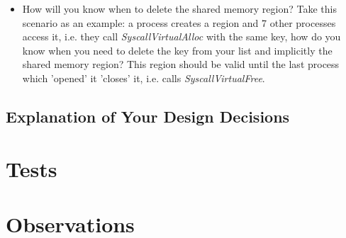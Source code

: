 \begin{enumerate}
\begin{itemize}
						\item How will you know when to delete the shared memory region? Take this scenario as an example: a process creates a region and 7 other processes access it, i.e. they call \textit{SyscallVirtualAlloc} with the same key, how do you know when you need to delete the key from your list and implicitly the shared memory region? This region should be valid until the last process which 'opened' it 'closes' it, i.e. calls \textit{SyscallVirtualFree}.
        \end{itemize}

\end{enumerate}


\subsection{Explanation of Your Design Decisions}


\section{Tests}



\section{Observations}


